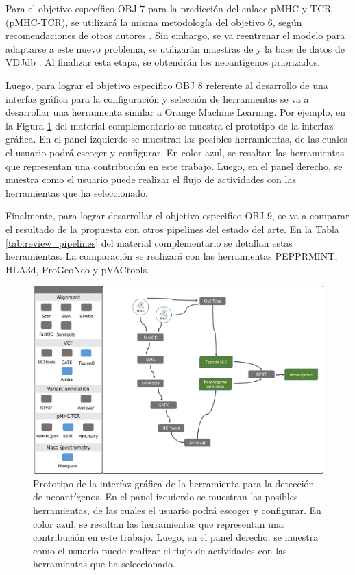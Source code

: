 \documentclass[a4paper,11pt]{article}
\begin{document}
Para el objetivo específico OBJ 7 para la predicción del enlace pMHC y TCR (pMHC-TCR), se utilizará la misma metodología del objetivo 6, según recomendaciones de otros autores \cite{li2020progeo, myronov2023bertrand}. Sin embargo, se va reentrenar el modelo para adaptarse a este nuevo problema, se utilizarán muestras de \cite{li2020progeo} y la base de datos de VDJdb \cite{shugay2018vdjdb}. Al finalizar esta etapa, se obtendrán los neoantígenos priorizados.


Luego, para lograr el objetivo especifico OBJ 8 referente al desarrollo de una interfaz gráfica para la configuración y selección de herramientas se va a desarrollar una herramienta similar a Orange Machine Learning. Por ejemplo, en la Figura \ref{fig:gui} del material complementario se muestra el prototipo de la interfaz gráfica. En el panel izquierdo se muestran las posibles herramientas, de las cuales el usuario podrá escoger y configurar. En color azul, se resaltan las herramientas que representan una contribución en este trabajo. Luego, en el panel derecho, se muestra como el usuario puede realizar el flujo de actividades con las herramientas que ha seleccionado.

Finalmente, para lograr desarrollar el objetivo especifico OBJ 9, se va a comparar el resultado de la propuesta con otros pipelines del estado del arte. En la Tabla \ref{tab:review_pipelines} del material complementario se detallan estas herramientas. La comparación se realizará con las herramientas PEPPRMINT, HLA3d, ProGeoNeo y pVACtools. 



\begin{figure}[H]
	\centering
	\includegraphics[width=\textwidth]{../img/proposal/gui2}
	\caption{Prototipo de la interfaz gráfica de la herramienta para la detección de neoantígenos. En el panel izquierdo se muestran las posibles herramientas, de las cuales el usuario podrá escoger y configurar. En color azul, se resaltan las herramientas que representan una contribución en este trabajo. Luego, en el panel derecho, se muestra como el usuario puede realizar el flujo de actividades con las herramientas que ha seleccionado.}
	\label{fig:gui}
\end{figure}
\end{document}
